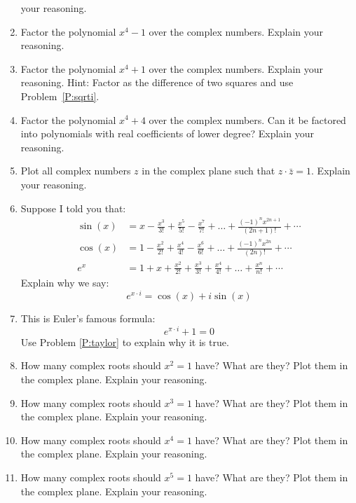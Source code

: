 \begin{problems}
\begin{enumerate}
  your reasoning.
\item Factor the polynomial $x^4-1$ over the complex numbers. Explain
  your reasoning.
\item Factor the polynomial $x^4+1$ over the complex numbers. Explain
  your reasoning. Hint: Factor as the difference of two squares and use Problem~\ref{P:sqrti}. 
\item Factor the polynomial $x^4+4$ over the complex numbers. Can it
  be factored into polynomials with real coefficients of lower degree?
  Explain your reasoning.
\item Plot all complex numbers $z$ in the complex plane such that
  $z\cdot \bar{z} =1$. Explain your reasoning.
\item\label{P:taylor} Suppose I told you that:
\begin{align*}
\sin(x) &= x - \frac{x^3}{3!} + \frac{x^5}{5!} - \frac{x^7}{7!} + \dots + \frac{(-1)^n x^{2n+1}}{(2n+1)!} + \cdots \\
\cos(x) &= 1 - \frac{x^2}{2!} + \frac{x^4}{4!} - \frac{x^6}{6!} + \dots + \frac{(-1)^n x^{2n}}{(2n)!} + \cdots \\
e^x &= 1 + x + \frac{x^2}{2!} + \frac{x^3}{3!} + \frac{x^4}{4!} + \dots + \frac{x^n}{n!} + \cdots 
\end{align*}
Explain why we say:
\[
e^{x\cdot i} = \cos(x) + i \sin(x)
\]
\item This is Euler's famous formula:
\[
e^{\pi \cdot i } + 1 = 0
\]
Use Problem \ref{P:taylor} to explain why it is true.
\item How many complex roots should $x^2 = 1$ have? What are they?
  Plot them in the complex plane.  Explain your reasoning.
\item How many complex roots should $x^3 = 1$ have? What are they?
  Plot them in the complex plane.  Explain your reasoning.
\item How many complex roots should $x^4 = 1$ have? What are they?
  Plot them in the complex plane.  Explain your reasoning.
\item How many complex roots should $x^5 = 1$ have? What are they?
  Plot them in the complex plane.  Explain your reasoning.




\end{enumerate}
\end{problems}


